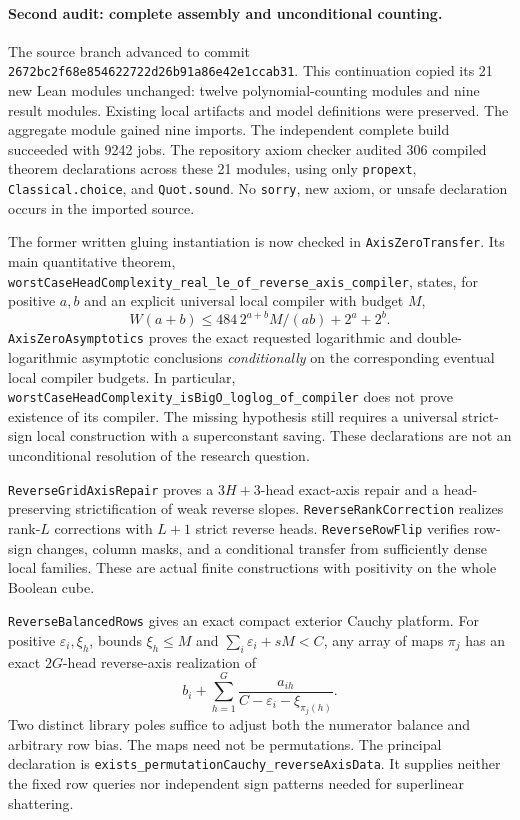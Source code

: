 \documentclass[11pt]{article}
\begin{document}
\paragraph{Second audit: complete assembly and unconditional counting.}
The source branch advanced to commit
\texttt{2672bc2f68e854622722d26b91a86e42e1ccab31}. This continuation
copied its 21 new Lean modules unchanged: twelve polynomial-counting
modules and nine result modules. Existing local artifacts and model
definitions were preserved. The aggregate module gained nine imports.
The independent complete build succeeded with 9242 jobs. The repository
axiom checker audited 306 compiled theorem declarations across these
21 modules, using only \texttt{propext}, \texttt{Classical.choice}, and
\texttt{Quot.sound}. No \texttt{sorry}, new axiom, or unsafe declaration
occurs in the imported source.

The former written gluing instantiation is now checked in
\texttt{AxisZeroTransfer}. Its main quantitative theorem,
\texttt{worstCaseHeadComplexity\_real\_le\_of\_reverse\_axis\_compiler},
states, for positive $a,b$ and an explicit universal local compiler
with budget $M$,
\[
 W(a+b)\leq 484\,2^{a+b}M/(ab)+2^a+2^b.
\]
\texttt{AxisZeroAsymptotics} proves the exact requested logarithmic
and double-logarithmic asymptotic conclusions \emph{conditionally} on
the corresponding eventual local compiler budgets. In particular,
\texttt{worstCaseHeadComplexity\_isBigO\_loglog\_of\_compiler}
does not prove existence of its compiler. The missing hypothesis still
requires a universal strict-sign local construction with a
superconstant saving. These declarations are not an unconditional
resolution of the research question.

\texttt{ReverseGridAxisRepair} proves a $3H+3$-head exact-axis repair
and a head-preserving strictification of weak reverse slopes.
\texttt{ReverseRankCorrection} realizes rank-$L$ corrections with $L+1$
strict reverse heads. \texttt{ReverseRowFlip} verifies row-sign changes,
column masks, and a conditional transfer from sufficiently dense local
families. These are actual finite constructions with positivity on the
whole Boolean cube.

\texttt{ReverseBalancedRows} gives an exact compact exterior Cauchy
platform. For positive $\varepsilon_i,\xi_h$, bounds $\xi_h\leq M$ and
$\sum_i\varepsilon_i+sM<C$, any array of maps $\pi_j$ has an exact
$2G$-head reverse-axis realization of
\[
 b_i+\sum_{h=1}^G\frac{a_{ih}}{C-\varepsilon_i-\xi_{\pi_j(h)}}.
\]
Two distinct library poles suffice to adjust both the numerator balance
and arbitrary row bias. The maps need not be permutations.
The principal declaration is
\texttt{exists\_permutationCauchy\_reverseAxisData}. It supplies neither
the fixed row queries nor independent sign patterns needed for
superlinear shattering.
\end{document}
